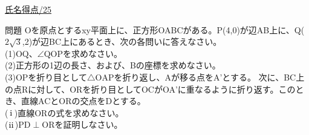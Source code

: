 \documentclass[paper=a4paper,titlepage]{jlreq}
\begin{document}
\underline{氏名\hspace{330pt}得点\hspace{70pt}/25\hspace{10pt}}
\begin{itembox}[l]{問題}
    Oを原点とするxy平面上に、正方形OABCがある。P(4,0)が辺AB上に、Q($2\sqrt{3}$\hspace{1pt},\hspace{1pt}2)が辺BC上にあるとき、次の各問いに答えなさい。
    \\(1)\hspace{3pt}$\mathrm{OQ}$、$\mathrm{\angle{QOP}}$を求めなさい。
    \\(2)正方形の1辺の長さ、および、Bの座標を求めなさい。
    \\(3)\hspace{3pt}OPを折り目として$\triangle{\mathrm{OAP}}$を折り返し、Aが移る点をA'とする。
    次に、BC上の点Rに対して、ORを折り目としてOCがOA'に重なるように折り返す。このとき、直線ACとORの交点をDとする。
    \\\hspace{15pt}($\mathrm{\hspace{.18em}i\hspace{.18em}}$)直線ORの式を求めなさい。
    \\\hspace{15pt}($\mathrm{\hspace{.08em}ii\hspace{.08em}}$)\hspace{3pt}$\mathrm{PD\perp OR}$を証明しなさい。
\end{itembox}
\end{document}
